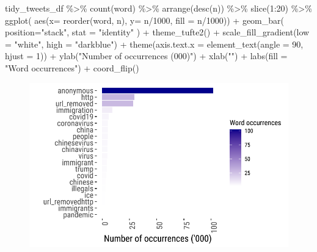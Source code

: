 \documentclass[
  letterpaper,
  DIV=11,
  numbers=noendperiod]{scrreprt}
\newenvironment{Shaded}{\begin{snugshade}}{\end{snugshade}}
\newcommand{\AttributeTok}[1]{\textcolor[rgb]{0.40,0.45,0.13}{#1}}
\newcommand{\DecValTok}[1]{\textcolor[rgb]{0.68,0.00,0.00}{#1}}
\newcommand{\FunctionTok}[1]{\textcolor[rgb]{0.28,0.35,0.67}{#1}}
\newcommand{\NormalTok}[1]{\textcolor[rgb]{0.00,0.23,0.31}{#1}}
\newcommand{\SpecialCharTok}[1]{\textcolor[rgb]{0.37,0.37,0.37}{#1}}
\newcommand{\StringTok}[1]{\textcolor[rgb]{0.13,0.47,0.30}{#1}}
\begin{document}
\begin{Shaded}
\begin{Highlighting}[]
\NormalTok{tidy\_tweets\_df }\SpecialCharTok{\%\textgreater{}\%} 
  \FunctionTok{count}\NormalTok{(word) }\SpecialCharTok{\%\textgreater{}\%} 
  \FunctionTok{arrange}\NormalTok{(}\FunctionTok{desc}\NormalTok{(n)) }\SpecialCharTok{\%\textgreater{}\%} 
  \FunctionTok{slice}\NormalTok{(}\DecValTok{1}\SpecialCharTok{:}\DecValTok{20}\NormalTok{) }\SpecialCharTok{\%\textgreater{}\%}
  \FunctionTok{ggplot}\NormalTok{( }\FunctionTok{aes}\NormalTok{(}\AttributeTok{x=} \FunctionTok{reorder}\NormalTok{(word, n), }\AttributeTok{y=}\NormalTok{ n}\SpecialCharTok{/}\DecValTok{1000}\NormalTok{, }\AttributeTok{fill =}\NormalTok{ n}\SpecialCharTok{/}\DecValTok{1000}\NormalTok{)) }\SpecialCharTok{+}
  \FunctionTok{geom\_bar}\NormalTok{( }\AttributeTok{position=}\StringTok{"stack"}\NormalTok{, }
            \AttributeTok{stat =} \StringTok{"identity"}
\NormalTok{            ) }\SpecialCharTok{+}
  \FunctionTok{theme\_tufte2}\NormalTok{() }\SpecialCharTok{+}
  \FunctionTok{scale\_fill\_gradient}\NormalTok{(}\AttributeTok{low =} \StringTok{"white"}\NormalTok{, }
                      \AttributeTok{high =} \StringTok{"darkblue"}\NormalTok{) }\SpecialCharTok{+}
  \FunctionTok{theme}\NormalTok{(}\AttributeTok{axis.text.x =} \FunctionTok{element\_text}\NormalTok{(}\AttributeTok{angle =} \DecValTok{90}\NormalTok{, }
                                   \AttributeTok{hjust =} \DecValTok{1}\NormalTok{)) }\SpecialCharTok{+}
  \FunctionTok{ylab}\NormalTok{(}\StringTok{"Number of occurrences (\textquotesingle{}000)"}\NormalTok{) }\SpecialCharTok{+}
  \FunctionTok{xlab}\NormalTok{(}\StringTok{""}\NormalTok{) }\SpecialCharTok{+}
  \FunctionTok{labs}\NormalTok{(}\AttributeTok{fill =} \StringTok{"Word occurrences"}\NormalTok{) }\SpecialCharTok{+}
  \FunctionTok{coord\_flip}\NormalTok{()}
\end{Highlighting}
\end{Shaded}

\begin{figure}[H]

{\centering \includegraphics{sentiment-analysis_files/figure-pdf/unnamed-chunk-18-1.pdf}

}

\end{figure}
\end{document}
